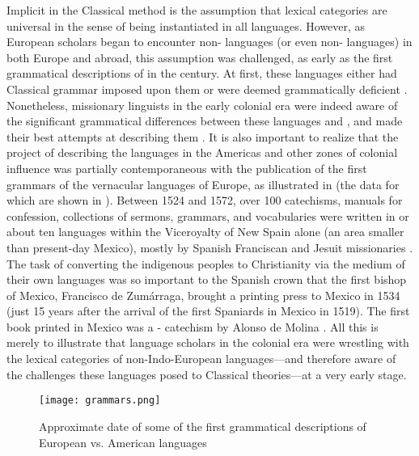 Implicit in the Classical method is the assumption that lexical categories are universal in the sense of being instantiated in all languages. However, as European scholars began to encounter non- languages (or even non- languages) in both Europe and abroad, this assumption was challenged, as early as the first grammatical descriptions of  in the  century. At first, these languages either had Classical grammar imposed upon them or were deemed grammatically deficient \parencite[3]{Suarez1983}. Nonetheless, missionary linguists in the early colonial era were indeed aware of the significant grammatical differences between these languages and , and made their best attempts at describing them \parencite[3--4]{Suarez1983}. It is also important to realize that the project of describing the languages in the Americas and other zones of colonial influence was partially contemporaneous with the publication of the first grammars of the vernacular languages of Europe, as illustrated in  (the data for which are shown in ). Between 1524 and 1572, over 100 catechisms, manuals for confession, collections of sermons, grammars, and vocabularies were written in or about ten languages within the Viceroyalty of New Spain alone (an area smaller than present-day Mexico), mostly by Spanish Franciscan and Jesuit missionaries \parencite[2]{Suarez1983}. The task of converting the indigenous peoples to Christianity via the medium of their own languages was so important to the Spanish crown that the first bishop of Mexico, Francisco de Zumárraga, brought a printing press to Mexico in 1534 (just 15 years after the arrival of the first Spaniards in Mexico in 1519). The first book printed in Mexico was a - catechism by Alonso de Molina \parencite[2]{Suarez1983}. All this is merely to illustrate that language scholars in the colonial era were wrestling with the lexical categories of non-Indo-European languages—and therefore aware of the challenges these languages posed to Classical theories—at a very early stage.

\begin{figure}
  \texttt{[image: grammars.png]}
  \caption{Approximate date of some of the first grammatical descriptions of European vs. American languages}
  \label{fig:grammars}
\end{figure}

\singlespacing
\setlength\LTleft{0pt}
\setlength\LTright{0pt}
\renewcommand{\arraystretch}{1.5}

